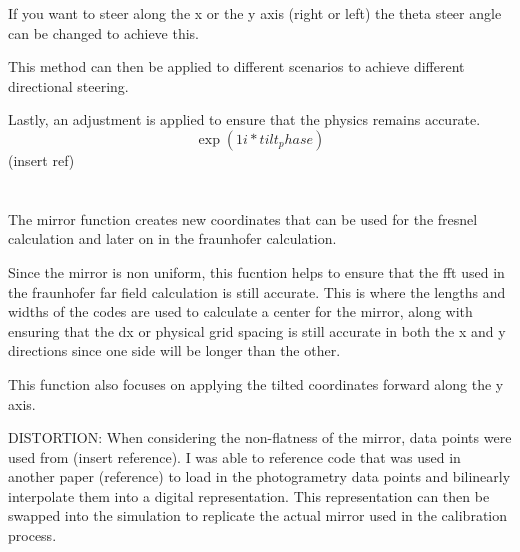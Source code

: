 \documentclass[twoside]{article}
\begin{document}
If you want to steer along the x or the y axis (right or left) the theta steer angle can be changed to achieve this. 

This method can then be applied to different scenarios to achieve different directional steering.

Lastly, an adjustment is applied to ensure that the physics remains accurate.
\begin{equation}
    \exp(1i * tilt_phase)
\end{equation}
(insert ref)



\section*{}
The mirror function creates new coordinates that can be used for the fresnel calculation and later on in the fraunhofer calculation.

Since the mirror is non uniform, this fucntion helps to ensure that the fft used in the fraunhofer far field calculation is still accurate. This is where the lengths and widths of the codes are used to calculate a center for the mirror, along with ensuring that the dx or physical grid spacing is still accurate in both the x and y directions since one side will be longer than the other.

This function also focuses on applying the tilted coordinates forward along the y axis. 


DISTORTION:
When considering the non-flatness of the mirror, data points were used from (insert reference). I was able to reference code that was used in another paper (reference) to load in the photogrametry data points and bilinearly interpolate them into a digital representation. This representation can then be swapped into the simulation to replicate the actual mirror used in the calibration process.
\end{document}
